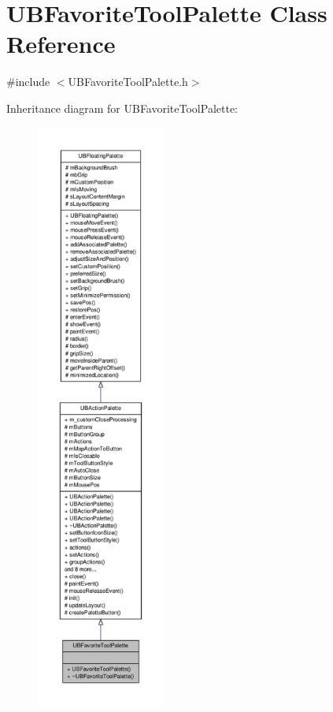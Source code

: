 \hypertarget{class_u_b_favorite_tool_palette}{\section{U\-B\-Favorite\-Tool\-Palette Class Reference}
\label{d0/d79/class_u_b_favorite_tool_palette}
}


{\ttfamily \#include $<$U\-B\-Favorite\-Tool\-Palette.\-h$>$}



Inheritance diagram for U\-B\-Favorite\-Tool\-Palette\-:
\nopagebreak
\begin{figure}[H]
\begin{center}
\leavevmode
\includegraphics[height=550pt]{d3/dfa/class_u_b_favorite_tool_palette__inherit__graph}
\end{center}
\end{figure}


